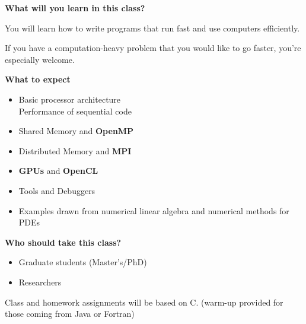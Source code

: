 \Large

{\sffamily\Large\bfseries What will you learn in this class?}

You will learn how to write programs that run fast and use computers
efficiently.

If you have a computation-heavy problem that you would like to go
faster, you're especially welcome.

\begin{comment}
\textbf{Pop Quiz:} \$400 at your favorite electronics retailer
buys you a parallel computer that will do
$4\cdot 10^{12}$ floating point operations (``flops'') per second,
but only load $5\cdot 10^{10}$ values from memory in the same
amount of time. How do you use such a machine well?
\end{comment}

\vspace{1.5ex}
{\sffamily\Large\bfseries What to expect}
\vspace{-1.5ex}
\begin{itemize}
\setlength{\itemsep}{-1mm}
  \item Basic processor architecture\\
    Performance of sequential code
  \item Shared Memory and \textbf{OpenMP}
  \item Distributed Memory and \textbf{MPI}
  \item \textbf{GPUs} and \textbf{OpenCL}
  \item Tools and Debuggers
  \item Examples drawn from numerical linear algebra and numerical
    methods for PDEs
\end{itemize}


\columnbreak
{\sffamily\Large\bfseries Who should take this class?}

\vspace{-0.5em}
\begin{itemize}
\setlength{\itemsep}{-1mm}
  \item Graduate students
    (Master's/PhD)
  \item Researchers
\end{itemize}
\vspace{-0.5em}
Class and homework assignments will be based on C.
(warm-up provided for those coming from
Java or Fortran)

